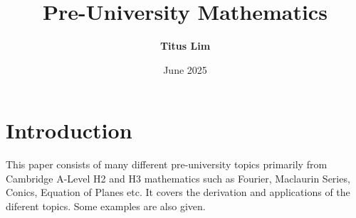 \documentclass[12pt]{article}
\title{Pre-University Mathematics}
\author{\textbf{Titus Lim}}
\date{June 2025}
\begin{document}
\begin{titlingpage}
	\maketitle
\end{titlingpage}

\tableofcontents
\newpage

\section{Introduction}

This paper consists of many different pre-university topics primarily from Cambridge A-Level H2 and H3 mathematics such as Fourier, Maclaurin Series, Conics, Equation of Planes etc.
It covers the derivation and applications of the diferent topics. Some examples are also given.
\end{document}
